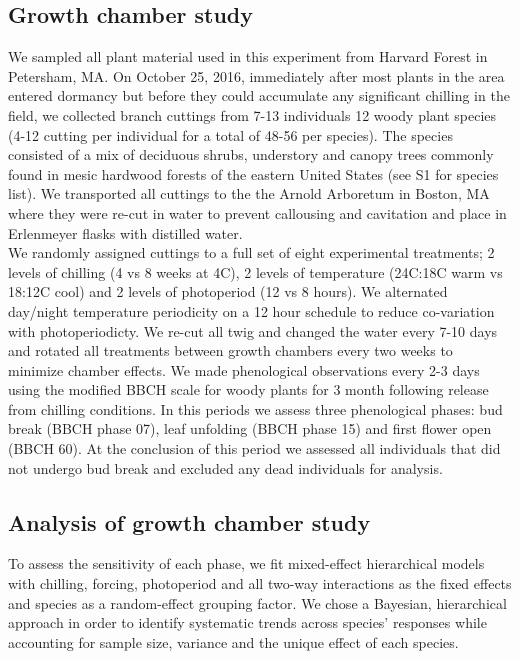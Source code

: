 \documentclass[11pt]{article}
\begin{document}
\subsection*{Growth chamber study}
\noindent We sampled all plant material used in this experiment from Harvard Forest in Petersham, MA. On October 25, 2016, immediately after most plants in the area entered dormancy but before they could accumulate any significant chilling in the field,  we collected branch cuttings from 7-13 individuals 12 woody plant species (4-12 cutting per individual for a total of 48-56 per species). The species consisted of a mix of deciduous shrubs, understory and canopy trees commonly found in mesic hardwood forests of the eastern United States (see S1 for species list). We transported all cuttings to the the Arnold Arboretum in Boston, MA where they were re-cut in water to prevent callousing and cavitation and place in Erlenmeyer flasks with distilled water.\\

\noindent We randomly assigned cuttings to a full set of eight experimental treatments; 2 levels of chilling (4 vs 8 weeks at 4\degree C), 2 levels of temperature (24\degree C:18\degree C warm vs 18\degree:12\degree C cool) and 2 levels of photoperiod (12 vs 8 hours). We alternated day/night temperature periodicity on a 12 hour schedule to reduce co-variation with photoperiodicty. We re-cut all twig and changed the water every 7-10 days and rotated all treatments between growth chambers every two weeks to minimize chamber effects. We made phenological observations every 2-3 days using the modified BBCH scale for woody plants \citep{} for 3 month following release from chilling conditions. In this periods we assess three phenological phases: bud break (BBCH phase 07), leaf unfolding (BBCH phase 15) and first flower open (BBCH 60). At the conclusion of this period we assessed all individuals that did not undergo bud break and excluded any dead individuals for analysis.
\subsection*{Analysis of growth chamber study}
\noindent To assess the sensitivity of each phase, we fit mixed-effect hierarchical models with chilling, forcing, photoperiod and all two-way interactions as the fixed effects and species as a random-effect grouping factor. We chose a Bayesian, hierarchical approach in order to identify systematic trends across species' responses while accounting for sample size, variance and the unique effect of each species.\\
\end{document}
